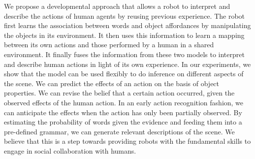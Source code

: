 We propose a developmental approach that allows a robot to interpret and describe the actions of human agents by reusing previous experience.
The robot first learns the association between words and object affordances by manipulating the objects in its environment.
It then uses this information to learn a mapping between its own actions and those performed by a human in a shared environment.
It finally fuses the information from these two models to interpret and describe human actions in light of its own experience.
In our experiments, we show that the model can be used flexibly to do inference on different aspects of the scene.
We can predict the effects of an action on the basis of object properties.
We can revise the belief that a certain action occurred, given the observed effects of the human action.
In an early action recognition fashion, we can anticipate the effects when the action has only been partially observed.
By estimating the probability of words given the evidence and feeding them into a pre-defined grammar, we can generate relevant descriptions of the scene.
We believe that this is a step towards providing robots with the fundamental skills to engage in social collaboration with humans.
